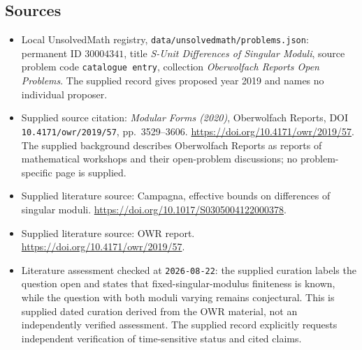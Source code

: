 \documentclass[11pt]{article}
\begin{document}
\subsection{Sources}
\begin{itemize}
\item Local UnsolvedMath registry, \texttt{data/unsolvedmath/problems.json}: permanent ID \(30004341\), title \emph{S-Unit Differences of Singular Moduli}, source problem code \texttt{catalogue entry}, collection \emph{Oberwolfach Reports Open Problems}. The supplied record gives proposed year 2019 and names no individual proposer.
\item Supplied source citation: \emph{Modular Forms (2020)}, Oberwolfach Reports, DOI \texttt{10.4171/owr/2019/57}, pp.\ 3529--3606. \url{https://doi.org/10.4171/owr/2019/57}. The supplied background describes Oberwolfach Reports as reports of mathematical workshops and their open-problem discussions; no problem-specific page is supplied.
\item Supplied literature source: Campagna, effective bounds on differences of singular moduli. \url{https://doi.org/10.1017/S0305004122000378}.
\item Supplied literature source: OWR report. \url{https://doi.org/10.4171/owr/2019/57}.
\item Literature assessment checked at \texttt{2026-08-22}: the supplied curation labels the question open and states that fixed-singular-modulus finiteness is known, while the question with both moduli varying remains conjectural. This is supplied dated curation derived from the OWR material, not an independently verified assessment. The supplied record explicitly requests independent verification of time-sensitive status and cited claims.
\end{itemize}
\end{document}
